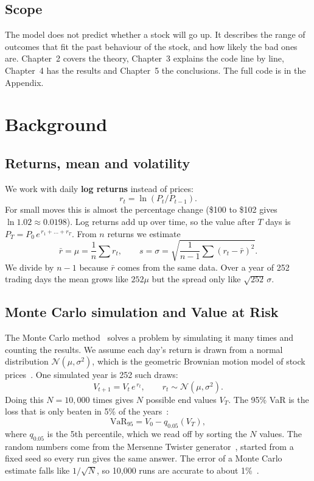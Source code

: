 \documentclass[10pt,a4paper,openany,oneside]{book}
\begin{document}
\section{Scope}
The model does not predict whether a stock will go up. It describes the range of outcomes
that fit the past behaviour of the stock, and how likely the bad ones are. Chapter~2 covers
the theory, Chapter~3 explains the code line by line, Chapter~4 has the results and
Chapter~5 the conclusions. The full code is in the Appendix.

\chapter{Background}

\section{Returns, mean and volatility}
We work with daily \textbf{log returns} instead of prices:
\begin{equation}
  r_t = \ln\left(P_t / P_{t-1}\right).
\end{equation}
For small moves this is almost the percentage change (\$100 to \$102 gives
$\ln 1.02 \approx 0.0198$). Log returns add up over time, so the value after $T$ days is
$P_T = P_0\, e^{\,r_1 + \dots + r_T}$. From $n$ returns we estimate
\begin{equation}
  \bar r = \mu = \frac{1}{n}\sum r_t, \qquad
  s = \sigma = \sqrt{\frac{1}{n-1}\sum (r_t-\bar r)^2 } .
\end{equation}
We divide by $n-1$ because $\bar r$ comes from the same data. Over a year of 252 trading days
the mean grows like $252\mu$ but the spread only like $\sqrt{252}\,\sigma$.

\section{Monte Carlo simulation and Value at Risk}
The Monte Carlo method~\cite{metropolis} solves a problem by simulating it many times and
counting the results. We assume each day's return is drawn from a normal distribution
$\mathcal{N}(\mu,\sigma^2)$, which is the geometric Brownian motion model of stock
prices~\cite{hull}. One simulated year is 252 such draws:
\begin{equation}
  V_{t+1} = V_t \, e^{\,r_t}, \qquad r_t \sim \mathcal{N}(\mu, \sigma^2).
\end{equation}
Doing this $N=10{,}000$ times gives $N$ possible end values $V_T$. The 95\% VaR is the loss
that is only beaten in 5\% of the years~\cite{jorion}:
\begin{equation}
  \text{VaR}_{95} = V_0 - q_{0.05}(V_T),
\end{equation}
where $q_{0.05}$ is the 5th percentile, which we read off by sorting the $N$ values. The
random numbers come from the Mersenne Twister generator~\cite{mt}, started from a fixed
seed so every run gives the same answer. The error of a Monte Carlo estimate falls like
$1/\sqrt N$, so 10{,}000 runs are accurate to about 1\%~\cite{glasserman}.
\end{document}
